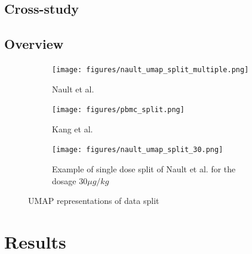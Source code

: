 \documentclass[12pt, a4paper]{article}
\begin{document}
\subsection{Cross-study}


\subsection{Overview}

\begin{figure}[h!]
    \centering
    \begin{subfigure}[t]{0.48\textwidth}
        \centering
        \texttt{[image: figures/nault\_umap\_split\_multiple.png]}
        \caption{Nault et al. \cite{nault2021single,nault2022benchmarking}}
        \label{fig:nault_umap}
    \end{subfigure}
    \hfill
    \begin{subfigure}[t]{0.48\textwidth}
        \centering
        \texttt{[image: figures/pbmc\_split.png]}
        \caption{Kang et al. \cite{kanaGenerativeModelingSinglecell2023}}
        \label{fig:pbmc_umap}
    \end{subfigure}
    \begin{subfigure}[b]{0.48\textwidth}
        \centering
        \texttt{[image: figures/nault\_umap\_split\_30.png]}
        \caption{Example of single dose split of Nault et al. \cite{kanaGenerativeModelingSinglecell2023} for the dosage $30 \mu g/kg$}
        \label{fig:pbmc_umap}
    \end{subfigure}    
    \caption{UMAP representations of data split}
    \label{fig:umap_side_by_side}
\end{figure}



\clearpage

\section{Results}
\end{document}
